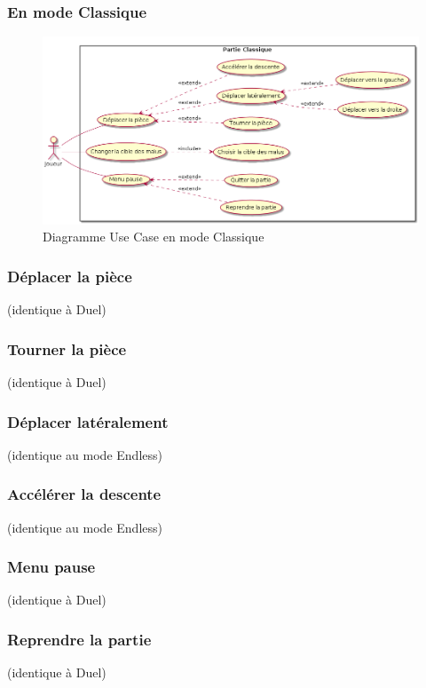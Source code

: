 \documentclass{article}
\begin{document}
\subsubsection{En mode Classique}

\begin{figure}[!h]
    \centering
    \includegraphics[width=1\textwidth]{uml/usescase/en-jeu/classic.png}
    \caption{Diagramme Use Case en mode Classique}
    \label{fig:Endless}
\end{figure}

\subsubsection*{Déplacer la pièce} (identique à Duel)
\subsubsection*{Tourner la pièce} (identique à Duel)

\subsubsection*{Déplacer latéralement} (identique au mode Endless)

\subsubsection*{Accélérer la descente} (identique au mode Endless)

\subsubsection*{Menu pause} (identique à Duel)
\subsubsection*{Reprendre la partie} (identique à Duel)
\end{document}

